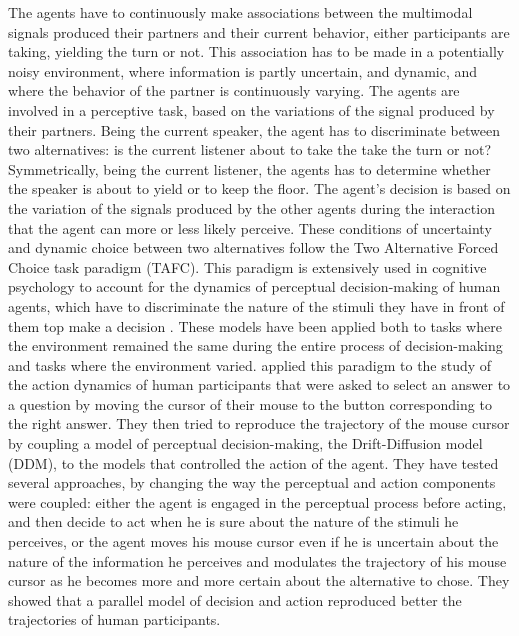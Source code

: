 The agents have to continuously make associations between the multimodal signals produced their partners and their current behavior, either participants are taking, yielding the turn or not. 
This association has to be made in a potentially noisy environment, where information is partly uncertain, and dynamic, and where the behavior of the partner is continuously varying.
The agents are involved in a perceptive task, based on the variations of the signal produced by their partners. 
Being the current speaker, the agent has to discriminate between two alternatives: is the current listener about to take the take the turn or not? Symmetrically, being the current listener, the agents has to determine whether the speaker is about to yield or to keep the floor. The agent's decision is based on the variation of the signals produced by the other agents during the interaction that the agent can more or less likely perceive.  
These conditions of uncertainty and dynamic choice between two alternatives follow the Two Alternative Forced Choice task paradigm (TAFC). This paradigm is extensively used in cognitive psychology to account for the dynamics of perceptual decision-making of human agents, which have to discriminate the nature of the stimuli they have in front of them top make a decision \citep{bogacz_physics_2006}. These models have been applied both to tasks where the environment remained the same during the entire process of decision-making and tasks where the environment varied.   
\cite{lepora_embodied_2015} applied this paradigm to the study of the action dynamics of human participants that were asked to select an answer to a question by moving the cursor of their mouse to the button corresponding to the right answer. They then tried to reproduce the trajectory of the mouse cursor by coupling a model of perceptual decision-making, the Drift-Diffusion model (DDM), to the models that controlled the action of the agent. 
They have tested several approaches, by changing the way the perceptual and action components were coupled: either the agent is engaged in the perceptual process before acting, and then decide to act when he is sure about the nature of the stimuli he perceives, or the agent moves his mouse cursor even if he is uncertain about the nature of the information he perceives and modulates the trajectory of his mouse cursor as he becomes more and more certain about the alternative to chose. They showed that a parallel model of decision and action reproduced better the trajectories of human participants. 

